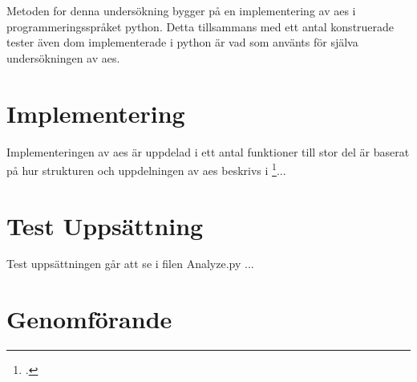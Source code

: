 Metoden for denna undersökning bygger på en implementering av \acrshort{aes} i programmeringsspråket
\gls{python}. Detta tillsammans med ett antal konstruerade tester även dom implementerade i
\gls{python} är vad som använts för själva undersökningen av \acrshort{aes}.

\section{Implementering}
Implementeringen av \acrshort{aes} är uppdelad i ett antal funktioner till stor del är baserat på
hur strukturen och uppdelningen av \acrshort{aes} beskrivs i \footcite{daemen1999aes}...

\section{Test Uppsättning}
Test uppsättningen går att se i filen Analyze.py ...

\section{Genomförande}